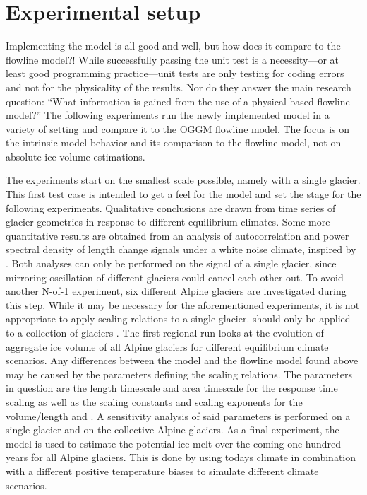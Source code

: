 


\section{Experimental setup} %
\label{sec:experimental_setup}
    
    Implementing the \vas{} model is all good and well, but how does it compare to the flowline model?!
    While successfully passing the unit test is a necessity---or at least good programming practice---unit tests are only testing for coding errors and not for the physicality of the results. Nor do they answer the main research question: ``What information is gained from the use of a physical based flowline model?'' The following experiments run the newly implemented model in a variety of setting and compare it to the OGGM flowline model. The focus is on the intrinsic model behavior and its comparison to the flowline model, not on absolute ice volume estimations.

    The experiments start on the smallest scale possible, namely with a single glacier. This first test case is intended to get a feel for the model and set the stage for the following experiments. Qualitative conclusions are drawn from time series of glacier geometries in response to different equilibrium climates. Some more quantitative results are obtained from an analysis of autocorrelation and power spectral density of length change signals under a white noise climate, inspired by \citep{Roe2014}. Both analyses can only be performed on the signal of a single glacier, since mirroring oscillation of different glaciers could cancel each other out. To avoid another N-of-1 experiment, six different Alpine glaciers are investigated during this step. 
    While it may be necessary for the aforementioned experiments, it is not appropriate to apply scaling relations to a single glacier. \Vas{} should only be applied to a collection of glaciers \citep{Bahr2015}. The first regional run looks at the evolution of aggregate ice volume of all Alpine glaciers for different equilibrium climate scenarios.
    Any differences between the \vas{} model and the flowline model found above may be caused by the parameters defining the scaling relations. The parameters in question are the length timescale and area timescale for the response time scaling as well as the scaling constants and scaling exponents for the volume/length and \vas{}. A sensitivity analysis of said parameters is performed on a single glacier and on the collective Alpine glaciers.
    As a final experiment, the \vas{} model is used to estimate the potential ice melt over the coming one-hundred years for all Alpine glaciers. This is done by using todays climate in combination with a different positive temperature biases to simulate different climate scenarios.

